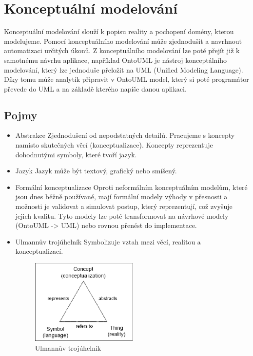 \documentclass{szzclass}
\begin{document}
\tableofcontents
\newpage

\section{Konceptuální modelování}

Konceptuální modelování slouží k popisu reality a pochopení domény, kterou modelujeme.
Pomocí konceptuálního modelování může zjednodušit a navrhnout automatizaci určitých úkonů.
Z konceptuálního modelování lze poté přejít již k samotnému návrhu aplikace, například OntoUML je nástroj konceptálního modelování,
který lze jednoduše přeložit na UML (Unified Modeling Language). Díky tomu může analytik připravit v OntoUML model, který si
poté programátor převede do UML a na základě kterého napíše danou aplikaci.

\subsection{Pojmy}

\begin{itemize}
    \item Abstrakce
          Zjednodušení od nepodstatných detailů. Pracujeme s koncepty namísto skutečných věcí (konceptualizace).
          Koncepty reprezentuje dohodnutými symboly, které tvoří jazyk.
    \item Jazyk
          Jazyk může být textový, grafický nebo smíšený.
    \item Formální konceptualizace
          Oproti neformálním konceptuálním modelům, které jsou dnes běžně používané, mají formální modely
          výhody v přesnosti a možnosti je validovat a simulovat postup, který reprezentují, což zvyšuje jejich kvalitu.
          Tyto modely lze poté transformovat na návrhové modely (OntoUML -> UML) nebo rovnou přenést do implementace.
    \item Ulmannův trojúhelník
          Symbolizuje vztah mezi věcí, realitou a konceptualizací.
          \begin{figure}[ht]
            \centering
            \includegraphics[width=0.5\textwidth]{topics/bi-wsi-si-05/ulmanns_triangle.png}
            \caption{Ulmannův trojúhelník}
          \end{figure}
\end{itemize}
\end{document}

